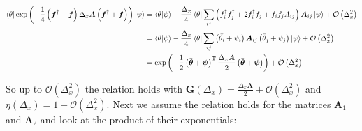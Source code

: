 \documentclass{article}
\begin{document}
\begin{align}
	\bra{\theta} \exp \left( -\frac{1}{4}\left(\boldsymbol{f}^{\dagger}+\boldsymbol{f} \right)\Delta_{x}\boldsymbol{A}\left( \boldsymbol{f}^{\dagger}+\boldsymbol{f}\right)  \right)\ket{\psi} &= \braket{\theta|\psi} -\frac{\Delta_{x}}{4}\bra{\theta} \sum_{ij }^{ } \left(f_{i}^{\dagger}f_{j}^{\dagger} + 2f_{i}^{\dagger}f_{j} + f_{i}f_{j} A_{ij}  \right)\boldsymbol{A}_{ij} \ket{\psi}+ \mathcal{O} \left(\Delta_{x}^{2} \right) \nonumber \\
	&= \braket{\theta|\psi} - \frac{\Delta_{x} }{4} \bra{\theta}\sum_{ij}^{ } \left(\bar{\theta_{i} } + \psi_{i} \right)\boldsymbol{A}_{ij}\left(\bar{\theta}_{j}+ \psi_{j} \right)\ket{\psi}+ \mathcal{O} \left(\Delta_{x}^{2} \right) \nonumber \\
	&= \exp \left( -\frac{1}{2}\left(\bar{\boldsymbol{\theta} } + \boldsymbol{\psi} \right)^{\mathrm{T}  } \frac{\Delta_{x} \boldsymbol{A}}{2} \left(\bar{\boldsymbol{\theta} } + \boldsymbol{\psi} \right)   \right)   + \mathcal{O} \left(\Delta_{x}^{2} \right) 
\end{align}

So up to $\mathcal{O} \left(\Delta_{x}^{2} \right)$ the relation holds with $\boldsymbol{G}\left(\Delta_{x} \right)= \frac{\Delta_{x}\boldsymbol{A} }{2}+ \mathcal{O} \left(\Delta_{x}^{2} \right)$ and $\eta\left(\Delta_{x} \right)= 1 + \mathcal{O} \left(\Delta_{x}^{2} \right)$. Next we assume the relation holds for the matrices $\boldsymbol{A}_{1}$ and $\boldsymbol{A}_{2}$ and look at the product of their exponentials:
\end{document}
